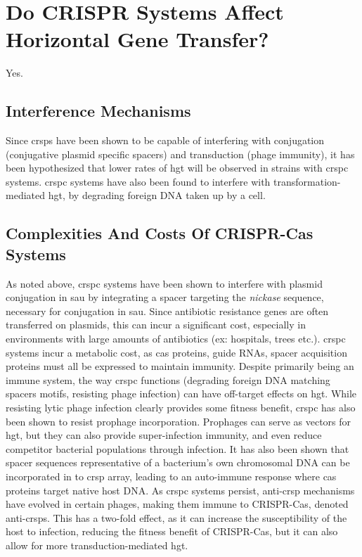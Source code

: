 \section*{Do CRISPR Systems Affect Horizontal Gene Transfer?}
Yes.
\subsection*{Interference Mechanisms}
Since \ac{crsp}s have been shown to be capable of interfering with conjugation (conjugative plasmid specific spacers) and transduction (phage immunity), it has been hypothesized that lower rates of \ac{hgt} will be observed in strains with \ac{crspc} systems\citep{staphlim}.
\ac{crspc} systems have also been found to interfere with transformation-mediated \ac{hgt}, by degrading foreign DNA taken up by a cell\citep{climtrans}.
\subsection*{Complexities And Costs Of CRISPR-Cas Systems}
As noted above, \ac{crspc} systems have been shown to interfere with plasmid conjugation in \ac{sau} by integrating a spacer targeting the \textit{nickase} sequence, necessary for conjugation in \ac{sau}\citep{staphlim}.
Since antibiotic resistance genes are often transferred on plasmids, this can incur a significant cost, especially in environments with large amounts of antibiotics (ex: hospitals, trees etc.)\citep{hospital}.
\ac{crspc} systems incur a metabolic cost, as \ac{cas} proteins, guide RNAs, spacer acquisition proteins must all be expressed to maintain immunity\citep{crispgen}.
Despite primarily being an immune system, the way \ac{crspc} functions (degrading foreign DNA matching spacers motifs, resisting phage infection) can have off-target effects on \ac{hgt}\citep{acqorres}.
While resisting lytic phage infection clearly provides some fitness benefit, \ac{crspc} has also been shown to resist prophage incorporation\citep{acqorres}.
Prophages can serve as vectors for \ac{hgt}, but they can also provide super-infection immunity, and even reduce competitor bacterial populations through infection\citep{acqorres,transhgt}.
It has also been shown that spacer sequences representative of a bacterium's own chromosomal DNA can be incorporated in to \ac{crsp} array, leading to an auto-immune response where \ac{cas} proteins target native host DNA\citep{selfcrisp}.
As \ac{crspc} systems persist, anti-\ac{crsp} mechanisms have evolved in certain phages, making them immune to CRISPR-Cas, denoted anti-\ac{crsp}s\citep{acqorres}.
This has a two-fold effect, as it can increase the susceptibility of the host to infection, reducing the fitness benefit of CRISPR-Cas, but it can also allow for more transduction-mediated \ac{hgt}\citep{acqorres}.
